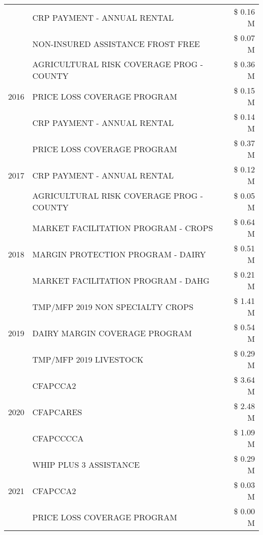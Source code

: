 \begin{tabular}{llr}
 & CRP PAYMENT - ANNUAL RENTAL & \$ 0.16 M \\
 & NON-INSURED ASSISTANCE FROST FREE & \$ 0.07 M \\
\cline{1-3}
\multirow[t]{3}{*}{2016} & AGRICULTURAL RISK COVERAGE PROG - COUNTY & \$ 0.36 M \\
 & PRICE LOSS COVERAGE PROGRAM & \$ 0.15 M \\
 & CRP PAYMENT - ANNUAL RENTAL & \$ 0.14 M \\
\cline{1-3}
\multirow[t]{3}{*}{2017} & PRICE LOSS COVERAGE PROGRAM & \$ 0.37 M \\
 & CRP PAYMENT - ANNUAL RENTAL & \$ 0.12 M \\
 & AGRICULTURAL RISK COVERAGE PROG - COUNTY & \$ 0.05 M \\
\cline{1-3}
\multirow[t]{3}{*}{2018} & MARKET FACILITATION PROGRAM - CROPS & \$ 0.64 M \\
 & MARGIN PROTECTION PROGRAM - DAIRY & \$ 0.51 M \\
 & MARKET FACILITATION PROGRAM - DAHG & \$ 0.21 M \\
\cline{1-3}
\multirow[t]{3}{*}{2019} & TMP/MFP 2019 NON SPECIALTY CROPS & \$ 1.41 M \\
 & DAIRY MARGIN COVERAGE PROGRAM & \$ 0.54 M \\
 & TMP/MFP 2019 LIVESTOCK & \$ 0.29 M \\
\cline{1-3}
\multirow[t]{3}{*}{2020} & CFAPCCA2 & \$ 3.64 M \\
 & CFAPCARES & \$ 2.48 M \\
 & CFAPCCCCA & \$ 1.09 M \\
\cline{1-3}
\multirow[t]{3}{*}{2021} & WHIP PLUS 3 ASSISTANCE & \$ 0.29 M \\
 & CFAPCCA2 & \$ 0.03 M \\
 & PRICE LOSS COVERAGE PROGRAM & \$ 0.00 M \\
\cline{1-3}
\bottomrule
\end{tabular}
